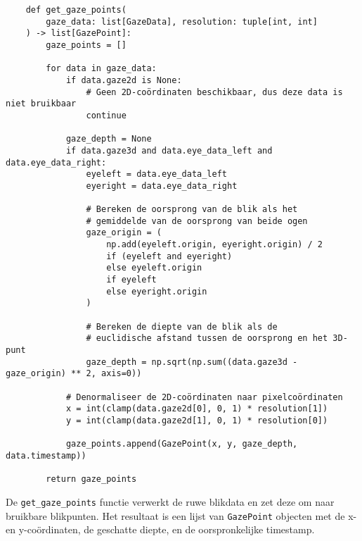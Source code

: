 \begin{listing}
  \begin{verbatim}
    def get_gaze_points(
        gaze_data: list[GazeData], resolution: tuple[int, int]
    ) -> list[GazePoint]:
        gaze_points = [] 
        
        for data in gaze_data:
            if data.gaze2d is None:
                # Geen 2D-coördinaten beschikbaar, dus deze data is niet bruikbaar
                continue

            gaze_depth = None
            if data.gaze3d and data.eye_data_left and data.eye_data_right:
                eyeleft = data.eye_data_left
                eyeright = data.eye_data_right

                # Bereken de oorsprong van de blik als het 
                # gemiddelde van de oorsprong van beide ogen
                gaze_origin = (
                    np.add(eyeleft.origin, eyeright.origin) / 2
                    if (eyeleft and eyeright)
                    else eyeleft.origin
                    if eyeleft
                    else eyeright.origin
                )

                # Bereken de diepte van de blik als de 
                # euclidische afstand tussen de oorsprong en het 3D-punt
                gaze_depth = np.sqrt(np.sum((data.gaze3d - gaze_origin) ** 2, axis=0))

            # Denormaliseer de 2D-coördinaten naar pixelcoördinaten
            x = int(clamp(data.gaze2d[0], 0, 1) * resolution[1])
            y = int(clamp(data.gaze2d[1], 0, 1) * resolution[0])

            gaze_points.append(GazePoint(x, y, gaze_depth, data.timestamp))

        return gaze_points
  \end{verbatim}
  \caption[\texttt{get\_gaze\_points} functie]{
    De \texttt{get\_gaze\_points} functie verwerkt de ruwe blikdata en zet deze om naar bruikbare blikpunten.
    Het resultaat is een lijst van \texttt{GazePoint} objecten met de x- en y-coördinaten, de geschatte diepte, en de oorspronkelijke timestamp.
  }
\end{listing}

